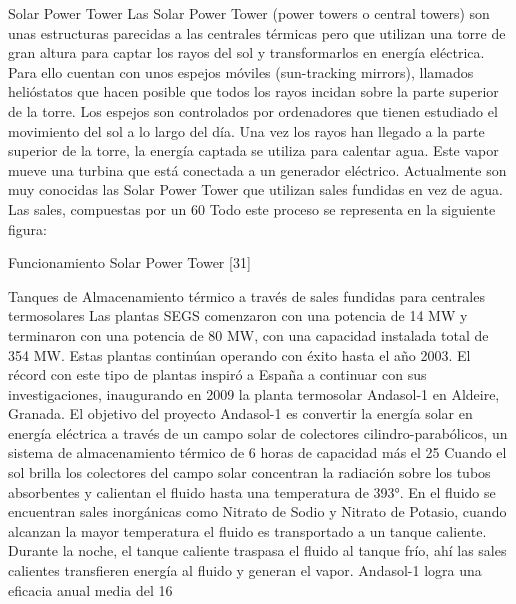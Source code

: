 \documentclass[12pt]{article}
\begin{document}
 
Solar Power Tower
Las Solar Power Tower (power towers o central towers) son unas estructuras parecidas a las centrales térmicas pero que utilizan una torre de gran altura para captar los rayos del sol y transformarlos en energía eléctrica. Para ello cuentan con unos espejos móviles (sun-tracking mirrors), llamados helióstatos que hacen posible que todos los rayos incidan sobre la parte superior de la torre. Los espejos son controlados por ordenadores que tienen estudiado el movimiento del sol a lo largo del día.
Una vez los rayos han llegado a la parte superior de la torre, la energía captada se utiliza para calentar agua. Este vapor mueve una turbina que está conectada a un generador eléctrico.
Actualmente son muy conocidas las Solar Power Tower que utilizan sales fundidas en vez de agua. Las sales, compuestas por un 60%
Todo este proceso se representa en la siguiente figura:

Funcionamiento Solar Power Tower [31]
 
 
Tanques de Almacenamiento térmico a través de sales fundidas para centrales termosolares
Las plantas SEGS comenzaron con una potencia de 14 MW y terminaron con una potencia de 80 MW, con una capacidad instalada total de 354 MW. Estas plantas continúan operando con éxito hasta el año 2003.
El récord con este tipo de plantas inspiró a España a continuar con sus investigaciones, inaugurando en 2009 la planta termosolar Andasol-1 en Aldeire, Granada.
El objetivo del proyecto Andasol-1 es convertir la energía solar en energía eléctrica a través de un campo solar de colectores cilindro-parabólicos, un sistema de almacenamiento térmico de 6 horas de capacidad más el 25%
Cuando el sol brilla los colectores del campo solar concentran la radiación sobre los tubos absorbentes y calientan el fluido hasta una temperatura de 393°. En el fluido se encuentran sales inorgánicas como Nitrato de Sodio y Nitrato de Potasio, cuando alcanzan la mayor temperatura el fluido es transportado a un  tanque caliente. Durante la noche, el tanque caliente traspasa el fluido al tanque frío, ahí las sales calientes transfieren energía al fluido y generan el vapor.
Andasol-1 logra una eficacia anual media del 16%
\end{document}
